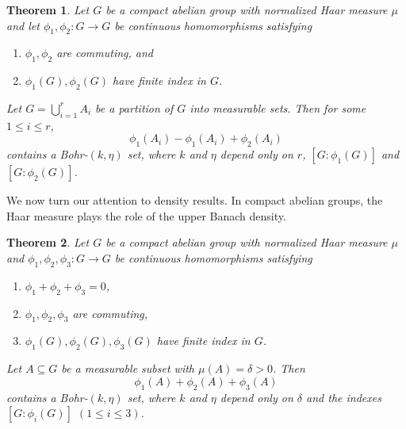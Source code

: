\documentclass[10pt]{article}
\newtheorem{theorem}{Theorem}[section]
\theoremstyle{definition}
\begin{document}
\begin{theorem} \label{th:main-partition}
Let $G$ be a compact abelian group with normalized Haar measure $\mu$ and let $\phi_1, \phi_2: G \rightarrow G$ be continuous homomorphisms satisfying
\begin{enumerate}[label=(\alph*), leftmargin=*]
\item $\phi_1, \phi_2$ are commuting, and
\item $\phi_1(G), \phi_2(G)$ have finite index in $G$.
\end{enumerate} 
Let $G = \bigcup_{i=1}^r A_i$ be a partition of $G$ into measurable sets. Then for some $1 \leq i \leq r$, 
\[
\phi_1(A_i) - \phi_1(A_i) + \phi_2(A_i)
\] 
contains a Bohr-$(k, \eta)$ set, where $k$ and $\eta$ depend only on $r$, $[G:\phi_1(G)]$ and $[G:\phi_2(G)]$.
\end{theorem}
\setcounter{remark}{1}
We now turn our attention to density results. In compact abelian groups, the Haar measure plays the role of the upper Banach density.  

\begin{theorem} \label{th:main-density}
Let $G$ be a compact abelian group with normalized Haar measure $\mu$ and $\phi_1, \phi_2, \phi_3: G \rightarrow G$ be continuous homomorphisms satisfying
\begin{enumerate}[label=(\alph*), leftmargin=*]
\item $\phi_1 + \phi_2 + \phi_3 = 0$,
\item $\phi_1, \phi_2, \phi_3$ are commuting,
\item $\phi_1(G), \phi_2(G), \phi_3(G)$ have finite index in $G$.
\end{enumerate} 
Let $A \subseteq G$ be a measurable subset with $\mu(A) = \delta >0$. Then 
\[
\phi_1(A) + \phi_2(A) + \phi_3(A)
\] contains a Bohr-$(k, \eta)$ set, where $k$ and $\eta$ depend only on $\delta$ and the indexes $[G:\phi_i(G)]$ $(1 \leq i \leq 3)$.
\end{theorem}
\end{document}
